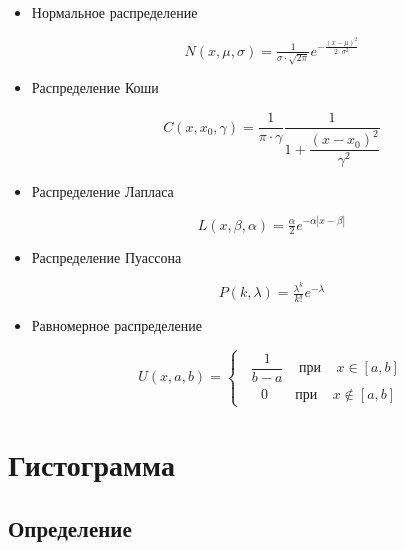 \documentclass{article}
\begin{document}
\begin{itemize}
  \item Нормальное распределение
  
  \begin{equation}
      N(x, \mu, \sigma) = \tfrac{1}{\sigma\cdot \sqrt{2\pi}}e^{-\tfrac{(x - \mu)^2}{2\cdot \sigma^2}}
  \end{equation}
  
  \item Распределение Коши
  
   \begin{equation}
      C(x, x_0, \gamma) = \dfrac{1}{\pi\cdot \gamma}\dfrac{1}{1 + \dfrac{(x - x_0)^2}{\gamma^2}}
  \end{equation}
  
  \item Распределение Лапласа
  
  \begin{equation}
      L(x, \beta, \alpha) =\tfrac{\alpha}{2}e^{-\alpha|x - \beta|}
  \end{equation}
  
  \item Распределение Пуассона
  
  \begin{equation}
      P(k, \lambda) = \tfrac{\lambda^k}{k!}e^{-\lambda}
  \end{equation}
  
  \item Равномерное распределение
  
    \begin{equation}
      U(x, a, b) =
        \begin{cases} 
            \;\; \dfrac{1}{b - a} \;\;\;\; \text{при} \;\;\;\; x \in [a, b]\\
            \,\,\,\:\;\; 0 \;\;\;\;\;\;\; \text{при} \;\;\;\; x \not\in [a, b]
        \end{cases}
  \end{equation}
  
\end{itemize}

\section{Гистограмма}

\subsection{Определение}
\end{document}
